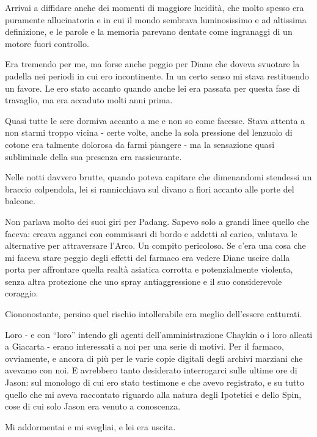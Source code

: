 Arrivai a diffidare anche dei momenti di maggiore lucidità, che molto
spesso era puramente allucinatoria e in cui il mondo sembrava
luminosissimo e ad altissima definizione, e le parole e la memoria
parevano dentate come ingranaggi di un motore fuori controllo.

Era tremendo per me, ma forse anche peggio per Diane che doveva svuotare
la padella nei periodi in cui ero incontinente. In un certo senso mi
stava restituendo un favore. Le ero stato accanto quando anche lei era
passata per questa fase di travaglio, ma era accaduto molti anni prima.

\separatorefiori

Quasi tutte le sere dormiva accanto a me e non so come facesse. Stava
attenta a non starmi troppo vicina - certe volte, anche la sola
pressione del lenzuolo di cotone era talmente dolorosa da farmi piangere
- ma la sensazione quasi subliminale della sua presenza era
rassicurante.

Nelle notti davvero brutte, quando poteva capitare che dimenandomi
stendessi un braccio colpendola, lei si rannicchiava sul divano a fiori
accanto alle porte del balcone.

Non parlava molto dei suoi giri per Padang. Sapevo solo a grandi linee
quello che faceva: creava agganci con commissari di bordo e addetti al
carico, valutava le alternative per attraversare l'Arco. Un compito
pericoloso. Se c'era una cosa che mi faceva stare peggio degli effetti
del farmaco era vedere Diane uscire dalla porta per affrontare quella
realtà asiatica corrotta e potenzialmente violenta, senza altra
protezione che uno spray antiaggressione e il suo considerevole
coraggio.

Ciononostante, persino quel rischio intollerabile era meglio dell'essere
catturati.

Loro - e con ``loro'' intendo gli agenti dell'amministrazione Chaykin o
i loro alleati a Giacarta - erano interessati a noi per una serie di
motivi. Per il farmaco, ovviamente, e ancora di più per le varie copie
digitali degli archivi marziani che avevamo con noi. E avrebbero tanto
desiderato interrogarci sulle ultime ore di Jason: sul monologo di cui
ero stato testimone e che avevo registrato, e su tutto quello che mi
aveva raccontato riguardo alla natura degli Ipotetici e dello Spin, cose
di cui solo Jason era venuto a conoscenza.

\separatorefiori

Mi addormentai e mi svegliai, e lei era uscita.

